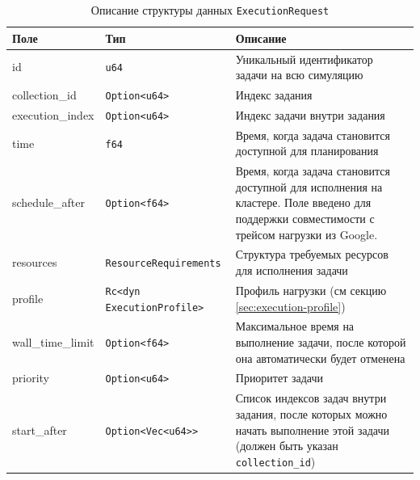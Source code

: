 \begin{table}[h]
    \centering
    \label{tab:execution_request_fields}
    \begin{tabular}{|l|l|p{8cm}|}
        \hline
        \textbf{Поле} & \textbf{Тип} & \textbf{Описание} \\
        \hline
        id & \texttt{u64} & Уникальный идентификатор задачи на всю симуляцию \\
        \hline
        collection\_id & \texttt{Option<u64>} & Индекс задания  \\
        \hline
        execution\_index & \texttt{Option<u64>} & Индекс задачи внутри задания \\
        \hline
        time & \texttt{f64} & Время, когда задача становится доступной для планирования \\
        \hline
        schedule\_after & \texttt{Option<f64>} & Время, когда задача становится доступной для исполнения на кластере. Поле введено для поддержки совместимости с трейсом нагрузки из Google. \\
        \hline
        resources & \texttt{ResourceRequirements} & Структура требуемых ресурсов для исполнения задачи \\
        \hline
        profile & \texttt{Rc<dyn ExecutionProfile>} & Профиль нагрузки (см секцию \ref{sec:execution-profile}) \\
        \hline
        wall\_time\_limit & \texttt{Option<f64>} & Максимальное время на выполнение задачи, после которой она автоматически будет отменена \\
        \hline
        priority & \texttt{Option<u64>} & Приоритет задачи \\
        \hline
        start\_after & \texttt{Option<Vec<u64>>} & Список индексов задач внутри задания, после которых можно начать выполнение этой задачи (должен быть указан \texttt{collection\_id}) \\
        \hline
    \end{tabular}
    \caption{Описание структуры данных \texttt{ExecutionRequest}}
    \label{tab:execution}
\end{table}

